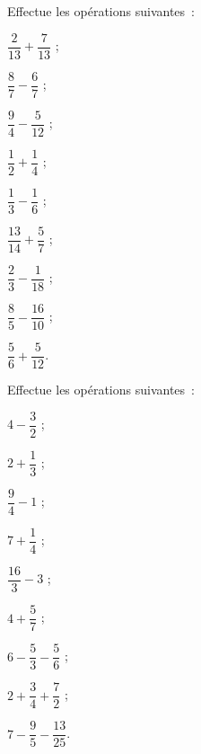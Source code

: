 \begin{exercice}
Effectue les opérations suivantes : \\[0.1em]
\begin{colenumerate}{3}
 \item $\dfrac{2}{13} + \dfrac{7}{13}$ ;
 \vspace{0.2cm}
 \item $\dfrac{8}{7} - \dfrac{6}{7}$ ;
 \vspace{0.2cm}
 \item $\dfrac{9}{4} - \dfrac{5}{12}$ ;
 \item $\dfrac{1}{2} + \dfrac{1}{4}$ ;
 \item $\dfrac{1}{3} - \dfrac{1}{6}$ ;
 \item $\dfrac{13}{14} + \dfrac{5}{7}$ ;
 \item $\dfrac{2}{3} - \dfrac{1}{18}$ ;
 \item $\dfrac{8}{5} - \dfrac{16}{10}$ ;
  \item $\dfrac{5}{6} + \dfrac{5}{12}$.
 \end{colenumerate}
\end{exercice}


\begin{exercice}
Effectue les opérations suivantes : \\[0.1em]
\begin{colenumerate}{3}
 \item $4 - \dfrac{3}{2}$ ;
 \vspace{0.2cm}
 \item $2 + \dfrac{1}{3}$ ;
 \vspace{0.2cm}
 \item $\dfrac{9}{4} - 1$ ;
 \item $7 + \dfrac{1}{4}$ ;
 \item $\dfrac{16}{3} - 3$ ;
 \item $4 + \dfrac{5}{7}$ ;
 \item $6 - \dfrac{5}{3} - \dfrac{5}{6}$ ;
 \item $2 + \dfrac{3}{4} + \dfrac{7}{2}$ ;
  \item $7 - \dfrac{9}{5} - \dfrac{13}{25}$.
 \end{colenumerate}
\end{exercice}

\newpage

